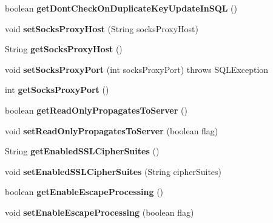 \begin{DoxyCompactItemize}
boolean {\bfseries get\+Dont\+Check\+On\+Duplicate\+Key\+Update\+In\+S\+QL} ()
\item 
\mbox{\label{classcom_1_1mysql_1_1jdbc_1_1_connection_properties_impl_a822bbfb66ca816499a6a1f50a9a0a8de}} 
void {\bfseries set\+Socks\+Proxy\+Host} (String socks\+Proxy\+Host)
\item 
\mbox{\label{classcom_1_1mysql_1_1jdbc_1_1_connection_properties_impl_a3e2e80df40245cf0ba3ddc46d6402bd6}} 
String {\bfseries get\+Socks\+Proxy\+Host} ()
\item 
\mbox{\label{classcom_1_1mysql_1_1jdbc_1_1_connection_properties_impl_ad8955ffc2a47cc4e3c18d2a7fdbf5241}} 
void {\bfseries set\+Socks\+Proxy\+Port} (int socks\+Proxy\+Port)  throws S\+Q\+L\+Exception 
\item 
\mbox{\label{classcom_1_1mysql_1_1jdbc_1_1_connection_properties_impl_a93b53bd66b3fedbe80618d349dee6195}} 
int {\bfseries get\+Socks\+Proxy\+Port} ()
\item 
\mbox{\label{classcom_1_1mysql_1_1jdbc_1_1_connection_properties_impl_a1d45cda6105dad57870a093d38b1484e}} 
boolean {\bfseries get\+Read\+Only\+Propagates\+To\+Server} ()
\item 
\mbox{\label{classcom_1_1mysql_1_1jdbc_1_1_connection_properties_impl_ae25a4a5a274b40cf419d44eb13dc4747}} 
void {\bfseries set\+Read\+Only\+Propagates\+To\+Server} (boolean flag)
\item 
\mbox{\label{classcom_1_1mysql_1_1jdbc_1_1_connection_properties_impl_a694ce8a8aadae4020cbe5bc3ac4a744f}} 
String {\bfseries get\+Enabled\+S\+S\+L\+Cipher\+Suites} ()
\item 
\mbox{\label{classcom_1_1mysql_1_1jdbc_1_1_connection_properties_impl_a314b5d6725be8533afb93ac606fe96c2}} 
void {\bfseries set\+Enabled\+S\+S\+L\+Cipher\+Suites} (String cipher\+Suites)
\item 
\mbox{\label{classcom_1_1mysql_1_1jdbc_1_1_connection_properties_impl_a4b3fc1966a902fd985301c530822e9c6}} 
boolean {\bfseries get\+Enable\+Escape\+Processing} ()
\item 
\mbox{\label{classcom_1_1mysql_1_1jdbc_1_1_connection_properties_impl_a5d269b34fac7632e8683ec1b480b7feb}} 
void {\bfseries set\+Enable\+Escape\+Processing} (boolean flag)
\end{DoxyCompactItemize}
